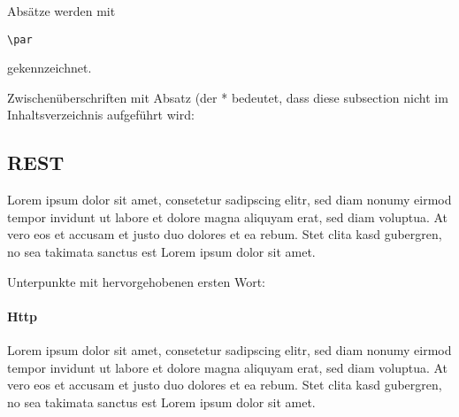 Absätze werden mit 
\begin{verbatim}
\par 
\end{verbatim}
gekennzeichnet.
\par
Zwischenüberschriften mit Absatz (der * bedeutet, dass diese subsection nicht im Inhaltsverzeichnis aufgeführt wird:
\subsection*{REST}
Lorem ipsum dolor sit amet, consetetur sadipscing elitr, sed diam nonumy eirmod tempor invidunt ut labore et dolore magna aliquyam erat, sed diam voluptua. At vero eos et accusam et justo duo dolores et ea rebum. Stet clita kasd gubergren, no sea takimata sanctus est Lorem ipsum dolor sit amet.

\par 
Unterpunkte mit hervorgehobenen ersten Wort:
\paragraph{Http} 
Lorem ipsum dolor sit amet, consetetur sadipscing elitr, sed diam nonumy eirmod tempor invidunt ut labore et dolore magna aliquyam erat, sed diam voluptua. At vero eos et accusam et justo duo dolores et ea rebum. Stet clita kasd gubergren, no sea takimata sanctus est Lorem ipsum dolor sit amet.